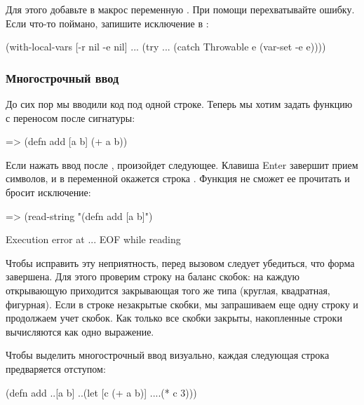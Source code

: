 Для этого добавьте в макрос  переменную \code{[-e nil]}. При помощи  перехватывайте ошибку. Если что-то поймано, запишите исключение в :

\begin{english}
  \begin{clojure}
(with-local-vars [-r nil -e nil]
  ...
  (try
    ...
    (catch Throwable e
      (var-set -e e))))
  \end{clojure}
\end{english}

\subsubsection{Многострочный ввод}

До сих пор мы вводили код под одной строке. Теперь мы хотим задать функцию с переносом после сигнатуры:

\begin{english}
  \begin{clojure}
=> (defn add [a b]
    (+ a b))
  \end{clojure}
\end{english}

Если нажать ввод после \code{b]}, произойдет следующее. Клавиша Enter завершит прием символов, и в переменной окажется строка . Функция  не сможет ее прочитать и бросит исключение:

\begin{english}
  \begin{clojure}
=> (read-string "(defn add [a b]")

Execution error at ...
EOF while reading
  \end{clojure}
\end{english}

Чтобы исправить эту неприятность, перед вызовом  следует убедиться, что форма завершена. Для этого проверим строку на баланс скобок: на каждую открывающую приходится закрывающая того же типа (круглая, квадратная, фигурная). Если в строке незакрытые скобки, мы запрашиваем еще одну строку и продолжаем учет скобок. Как только все скобки закрыты, накопленные строки вычисляются как одно выражение.

Чтобы выделить многострочный ввод визуально, каждая следующая строка предваряется отступом:

\begin{english}
  \begin{clojure}
(defn add
..[a b]
..(let [c (+ a b)]
....(* c 3)))
  \end{clojure}
\end{english}

